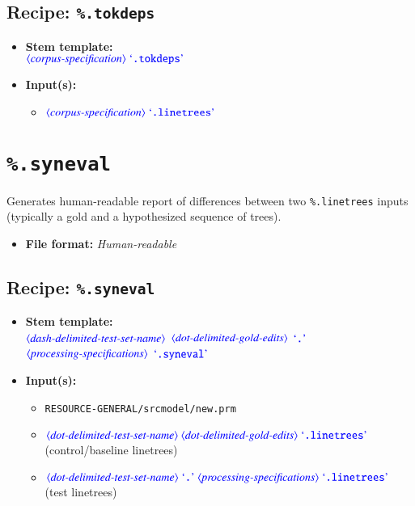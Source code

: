 \documentclass[12pt]{report}
\def\blue{\color{blue}}
\begin{document}
\subsection{Recipe: {\blue\tt \%.tokdeps}}

\begin{itemize}
      \item \textbf{Stem template:}\\
      $\dtype{corpus-specification} \ \dcode{.tokdeps}$
      \item \textbf{Input(s):}
      \begin{itemize}
            \item $\dtype{corpus-specification} \ \dcode{.linetrees}$
      \end{itemize}
\end{itemize}


\section{\blue\tt \%.syneval}

Generates human-readable report of differences between two {\blue\tt \%.linetrees} inputs (typically a gold and a hypothesized sequence of trees).

\begin{itemize}
\item\textbf{File format:} \textit{Human-readable}
\end{itemize}

\subsection{Recipe: {\blue\tt \%.syneval}}

\begin{itemize}
      \item \textbf{Stem template:}\\
      $\dtype{dash-delimited-test-set-name}$ $\dtype{dot-delimited-gold-edits}$ $\dcode{.}$ $\dtype{processing-specifications}$ $\dcode{.syneval}$
      \item \textbf{Input(s):}
      \begin{itemize}
            \item {\tt RESOURCE-GENERAL/srcmodel/new.prm}
            \item $\dtype{dot-delimited-test-set-name} \ \dtype{dot-delimited-gold-edits} \ \dcode{.linetrees}$ (control/baseline linetrees)
            \item  $\dtype{dot-delimited-test-set-name} \ \dcode{.} \ \dtype{processing-specifications} \ \dcode{.linetrees}$ (test linetrees)
      \end{itemize}
\end{itemize}
\end{document}
